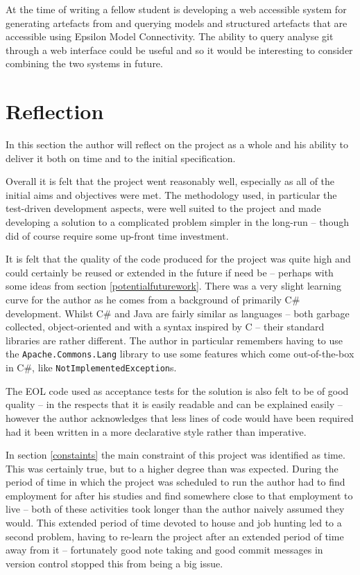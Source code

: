 \documentclass[11pt]{book}
\newcommand{\code}[1]{\texttt{#1}}
\begin{document}
At the time of writing a fellow student is developing a web accessible system for generating artefacts from and querying models and structured artefacts that are accessible using Epsilon Model Connectivity. The ability to query analyse git through a web interface could be useful and so it would be interesting to consider combining the two systems in future.

\section{Reflection}
In this section the author will reflect on the project as a whole and his ability to deliver it both on time and to the initial specification.

Overall it is felt that the project went reasonably well, especially as all of the initial aims and objectives were met. The methodology used, in particular the test-driven development aspects, were well suited to the project and made developing a solution to a complicated problem simpler in the long-run -- though did of course require some up-front time investment.

It is felt that the quality of the code produced for the project was quite high and could certainly be reused or extended in the future if need be -- perhaps with some ideas from section \ref{potentialfuturework}. There was a very slight learning curve for the author as he comes from a background of primarily C\# development. Whilst C\# and Java are fairly similar as languages -- both garbage collected, object-oriented and with a syntax inspired by C -- their standard libraries are rather different. The author in particular remembers having to use the \code{Apache.Commons.Lang} library to use some features which come out-of-the-box in C\#, like \code{NotImplementedException}s.

The EOL code used as acceptance tests for the solution is also felt to be of good quality -- in the respects that it is easily readable and can be explained easily -- however the author acknowledges that less lines of code would have been required had it been written in a more declarative style rather than imperative. 

In section \ref{constaints} the main constraint of this project was identified as time. This was certainly true, but to a higher degree than was expected. During the period of time in which the project was scheduled to run the author had to find employment for after his studies and find somewhere close to that employment to live -- both of these activities took longer than the author naively assumed they would. This extended period of time devoted to house and job hunting led to a second problem, having to re-learn the project after an extended period of time away from it -- fortunately good note taking and good commit messages in version control stopped this from being a big issue. 
\end{document}
